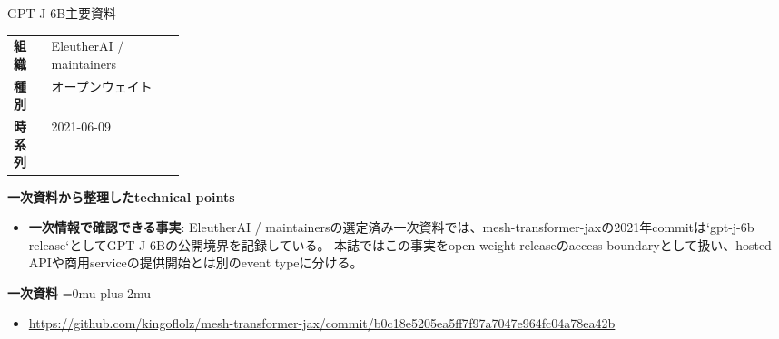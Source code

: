 \begin{technicalnote}{GPT-J-6B}{主要資料}
\begingroup
\begin{tabularx}{\linewidth}{@{}>{\bfseries}p{0.22\linewidth}X@{}}
組織 & EleutherAI / maintainers \\
種別 & オープンウェイト \\
時系列 & 2021-06-09 \\
\end{tabularx}
\smallskip
{\bfseries 一次資料から整理したtechnical points}
\begin{itemize}[leftmargin=1.5em,itemsep=0.35em]
\item \textbf{一次情報で確認できる事実}: EleutherAI / maintainersの選定済み一次資料では、mesh-transformer-jaxの2021年commitは`gpt-j-6b release`としてGPT-J-6Bの公開境界を記録している。 本誌ではこの事実をopen-weight releaseのaccess boundaryとして扱い、hosted APIや商用serviceの提供開始とは別のevent typeに分ける。
\end{itemize}
\begin{minipage}{\linewidth}
\begin{samepage}
{\bfseries 一次資料}
\begingroup\sloppy
\Urlmuskip=0mu plus 2mu\relax
\begin{itemize}[leftmargin=1.5em,itemsep=0.25em]
\item {\scriptsize\url{https://github.com/kingoflolz/mesh-transformer-jax/commit/b0c18e5205ea5ff7f97a7047e964fc04a78ea42b}}
\end{itemize}
\endgroup
\end{samepage}
\end{minipage}
\endgroup
\end{technicalnote}
\medskip

